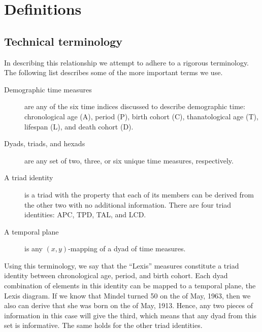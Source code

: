 \documentclass[12pt,oneside,a4paper]{article} %
\begin{document}
\section{Definitions}
\subsection*{Technical terminology}
In describing this relationship we attempt to adhere to a rigorous
terminology.
The following list describes some of the more important terms we use.
\begin{description}
\item[Demographic time measures] are any of the six time indices discussed to
describe demographic time: chronological age (A), period (P), birth cohort (C), thanatological age (T), lifespan (L), and death cohort (D).
\item[Dyads, triads, and hexads] are any set of two, three, or six unique time
measures, respectively.
\item[A triad identity] is a triad with the property that each of its members
can be derived from the other two with no additional information. There are four triad
identities: APC, TPD, TAL, and LCD.
\item[A temporal plane] is any $(x,y)$-mapping of a dyad of time measures.
\end{description}
Using this terminology, we say that the ``Lexis'' measures
constitute a triad identity between chronological age, period, and birth cohort. Each dyad
combination of elements in this identity can be mapped to a
temporal plane, the Lexis diagram. If we know that Mindel turned 50 on the
 of May, 1963, then we also can derive that she was born on the  of
May, 1913. Hence, any two pieces of information in this case will give the
third, which means that any dyad from this set is informative. The same holds
for the other triad identities.
\end{document}
